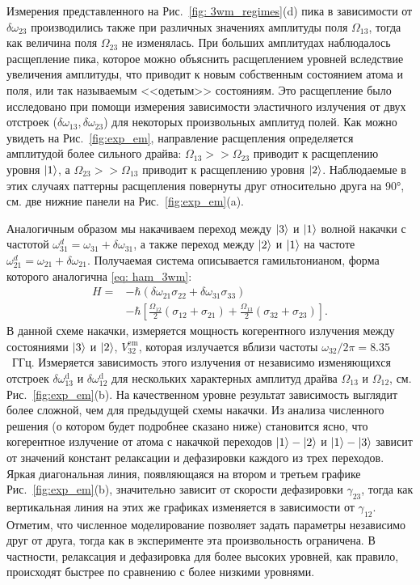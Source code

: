 Измерения представленного на Рис.~\ref{fig: 3wm_regimes}(d) пика в зависимости от $\delta\omega_{23}$ производились также при различных значениях амплитуды поля $\Omega_{13}$, тогда как величина поля $\Omega_{23}$ не изменялась. При больших амплитудах наблюдалось расщепление пика, которое можно объяснить расщеплением уровней вследствие увеличения амплитуды, что приводит к новым собственным состоянием атома и поля, или так называемым <<одетым>> состояниям. Это расщепление было исследовано при помощи измерения зависимости эластичного излучения от двух отстроек ($\delta\omega_{13}, \delta\omega_{23}$) для некоторых произвольных амплитуд полей. Как можно увидеть на Рис.~\ref{fig:exp_em}, направление расщепления определяется амплитудой более сильного драйва: $\Omega_{13}>>\Omega_{23}$ приводит к расщеплению уровня $\ket{1}$, а $\Omega_{23}>>\Omega_{13}$ приводит к расщеплению уровня $\ket{2}$. Наблюдаемые в этих случаях паттерны расщепления повернуты друг относительно друга на \ang{90}, см. две нижние панели на Рис.~\ref{fig:exp_em}(a).

Аналогичным образом мы накачиваем переход между $\ket{3}$ и $\ket{1}$ волной накачки с частотой $\omega_{31}^{d}=\omega_{31}+\delta\omega_{31}$, а также переход между $
\ket{2}$ и $\ket{1}$ на частоте $\omega_{21}^{d}=\omega_{21}+\delta\omega_{21}$. Получаемая система описывается гамильтонианом, форма которого аналогична \eqref{eq: ham_3wm}:
\begin{equation}
	\begin{aligned}
		H={}&-\hbar(\delta\omega_{21}\sigma_{22}+\delta\omega_{31}\sigma_{33})\\
		&-\hbar\left[\frac{\Omega_{12}}{2}(\sigma_{12}+\sigma_{21})+\frac{\Omega_{13}}{2}(\sigma_{32}+\sigma_{23})\right].
	\end{aligned}
\label{H1}
\end{equation}
В данной схеме накачки, измеряется мощность когерентного излучения между состояниями $\ket{3}$ и $\ket{2}$, $V_{32}^{\text{em}}$, которая излучается вблизи частоты $\omega_{32}/2\pi=8.35$~ГГц. Измеряется зависимость этого излучения от независимо изменяющихся отстроек $\delta\omega^{\text{d}}_{13}$ и $\delta\omega^{\text{d}}_{12}$ для нескольких характерных амплитуд драйва $\Omega_13$ и $\Omega_{12}$, см. Рис.~\ref{fig:exp_em}(b). На качественном уровне результат зависимость выглядит более сложной, чем для предыдущей схемы накачки. Из анализа численного решения (о котором будет подробнее сказано ниже) становится ясно, что когерентное излучение от атома с накачкой переходов $\ket{1}-\ket{2}$ и $\ket{1}-\ket{3}$ зависит от значений констант релаксации и дефазировки каждого из трех переходов. Яркая диагональная линия, появляющаяся на втором и третьем графике Рис.~\ref{fig:exp_em}(b), значительно зависит от скорости дефазировки $\gamma_{23}$, тогда как вертикальная линия на этих же графиках изменяется в зависимости от $\gamma_{12}$. Отметим, что численное моделирование позволяет задать параметры независимо друг от друга, тогда как в эксперименте эта произвольность ограничена. В частности, релаксация и дефазировка для более высоких уровней, как правило, происходят быстрее по сравнению с более низкими уровнями. 

